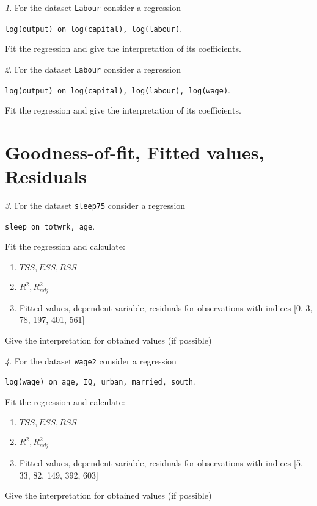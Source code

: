 \documentclass[12pt]{article}
\theoremstyle{remark}
\newtheorem{problem}{}[section]
\begin{document}
\begin{problem}
For the dataset \texttt{Labour} consider a regression
\begin{center}
\texttt{log(output) on log(capital), log(labour)}.
\end{center}
Fit the regression and give the interpretation of its coefficients.
\end{problem}

\begin{problem}
For the dataset \texttt{Labour} consider a regression
\begin{center}
\texttt{log(output) on log(capital), log(labour), log(wage)}.
\end{center}
Fit the regression and give the interpretation of its coefficients.
\end{problem}

\section{Goodness-of-fit, Fitted values, Residuals}

\begin{problem}
For the dataset \texttt{sleep75} consider a regression
\begin{center}
\texttt{sleep on totwrk, age}.
\end{center}
Fit the regression and calculate:
\begin{enumerate}
	\item \(TSS, ESS, RSS\)
	\item \(R^2, R^2_{adj}\)
	\item Fitted values, dependent variable, residuals 
	for observations with indices [0, 3, 78, 197, 401, 561]
\end{enumerate}
Give the interpretation for obtained values (if possible)
\end{problem}

\begin{problem}
For the dataset \texttt{wage2} consider a regression
\begin{center}
\texttt{log(wage) on age, IQ, urban, married, south}.
\end{center}
Fit the regression and calculate:
\begin{enumerate}
	\item \(TSS, ESS, RSS\)
	\item \(R^2, R^2_{adj}\)
	\item Fitted values, dependent variable, residuals 
	for observations with indices [5, 33, 82, 149, 392, 603]
\end{enumerate}
Give the interpretation for obtained values (if possible)
\end{problem}
\end{document}
